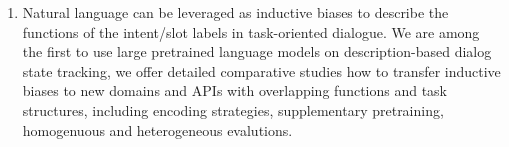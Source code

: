 \begin{enumerate}
\item Natural language can be leveraged as inductive biases to
  describe the functions of the intent/slot labels in task-oriented
  dialogue. We are among the first to use large pretrained language
  models on description-based dialog state tracking, we offer detailed
  comparative studies how to transfer inductive biases to new domains
  and APIs with overlapping functions and task structures, including
  encoding strategies, supplementary pretraining, homogenuous and
  heterogeneous evalutions.
\end{enumerate}



